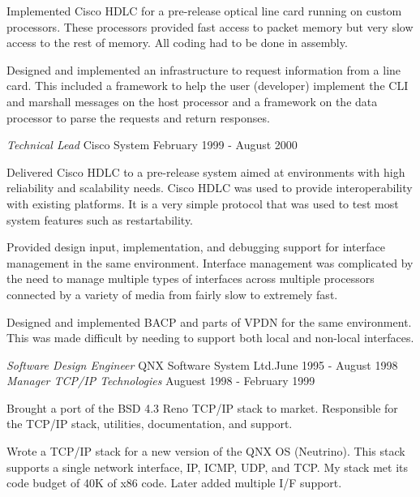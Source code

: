 \documentclass[margin]{res}
\begin{document}
\begin{resume}
                Implemented Cisco HDLC for a pre-release optical line card
                running on custom processors. These processors provided
                fast access to packet memory but very slow access to the
                rest of memory. All coding had to be done in assembly.

                Designed and implemented an infrastructure to request
                information from a line card. This included a framework to
                help the user (developer) implement the CLI and marshall
                messages on the host processor and a framework on the data
                processor to parse the requests and return responses.

                {\sl\large Technical Lead } Cisco System \hfill February 1999 - August 2000

                Delivered Cisco HDLC to a pre-release system aimed at environments with
                high reliability and scalability needs. Cisco HDLC was used to provide
                interoperability with existing platforms. It is a very simple protocol
                that was used to test most system features such as restartability.


                Provided design input, implementation, and debugging support for
                interface management in the same environment. Interface management was
                complicated by the need to manage multiple types of interfaces across
                multiple processors connected by a variety of media from fairly slow to
                extremely fast.

                Designed and implemented BACP and parts of VPDN for the same
                environment. This was made difficult by needing to support both local
                and non-local interfaces.

                {\sl\large Software Design Engineer } QNX Software System Ltd.\hfill June 1995 - August 1998 \\
                {\sl Manager TCP/IP Technologies } \hfill Auguest 1998 - February 1999

                Brought a port of the BSD 4.3 Reno TCP/IP stack to
                market. Responsible for the TCP/IP stack, utilities,
                documentation, and support.

                Wrote a TCP/IP stack for a new version of the QNX
                OS (Neutrino). This stack supports a single network
                interface, IP, ICMP, UDP, and TCP. My stack met its
                code budget of 40K of x86 code. Later added multiple
                I/F support.


\end{resume}
\end{document}

